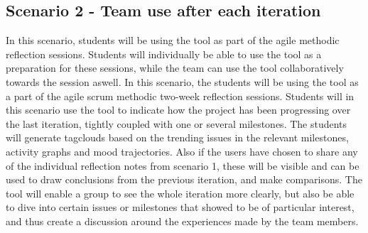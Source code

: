 \subsection{Scenario 2 - Team use after each iteration}
\label{scenario2}
In this scenario, students will be using the tool as part of the agile methodic reflection sessions. Students will individually be able to use the tool as a preparation for these sessions, while the team can use the tool collaboratively towards the session aswell.
In this scenario, the students will be using the tool as a part of the agile scrum methodic two-week reflection sessions. Students will in this scenario use the tool to indicate how the project has been progressing over the last iteration, tightly coupled with one or several milestones. The students will generate tagclouds based on the trending issues in the relevant milestones, activity graphs and mood trajectories. Also if the users have chosen to share any of the individual reflection notes from scenario 1, these will be visible and can be used to draw conclusions from the previous iteration, and make comparisons. The tool will enable a group to see the whole iteration more clearly, but also be able to dive into certain issues or milestones that showed to be of particular interest, and thus create a discussion around the experiences made by the team members.  